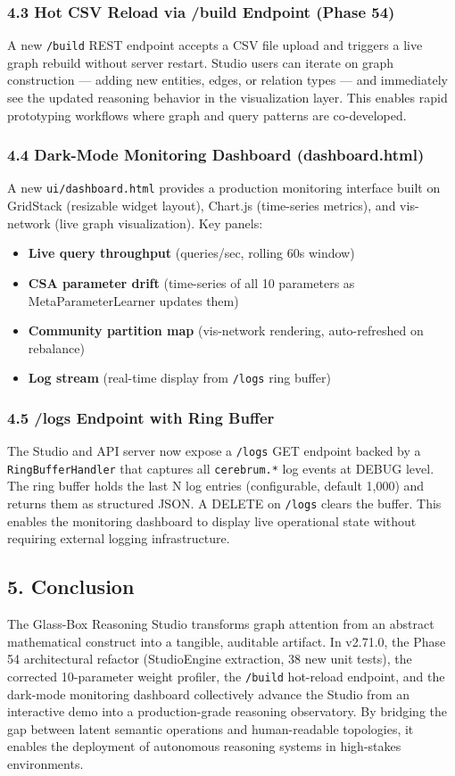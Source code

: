 \subsubsection*{4.3 Hot CSV Reload via /build Endpoint (Phase 54)}
A new \texttt{/build} REST endpoint accepts a CSV file upload and triggers a live graph rebuild without server restart. Studio users can iterate on graph construction --- adding new entities, edges, or relation types --- and immediately see the updated reasoning behavior in the visualization layer. This enables rapid prototyping workflows where graph and query patterns are co-developed.

\subsubsection*{4.4 Dark-Mode Monitoring Dashboard (dashboard.html)}
A new \texttt{ui/dashboard.html} provides a production monitoring interface built on GridStack (resizable widget layout), Chart.js (time-series metrics), and vis-network (live graph visualization). Key panels:
\begin{itemize}
  \item \textbf{Live query throughput} (queries/sec, rolling 60s window)
  \item \textbf{CSA parameter drift} (time-series of all 10 parameters as MetaParameterLearner updates them)
  \item \textbf{Community partition map} (vis-network rendering, auto-refreshed on rebalance)
  \item \textbf{Log stream} (real-time display from \texttt{/logs} ring buffer)
\end{itemize}


\subsubsection*{4.5 /logs Endpoint with Ring Buffer}
The Studio and API server now expose a \texttt{/logs} GET endpoint backed by a \texttt{RingBufferHandler} that captures all \texttt{cerebrum.*} log events at DEBUG level. The ring buffer holds the last N log entries (configurable, default 1,000) and returns them as structured JSON. A DELETE on \texttt{/logs} clears the buffer. This enables the monitoring dashboard to display live operational state without requiring external logging infrastructure.

\subsection*{5. Conclusion}
The Glass-Box Reasoning Studio transforms graph attention from an abstract mathematical construct into a tangible, auditable artifact. In v2.71.0, the Phase 54 architectural refactor (StudioEngine extraction, 38 new unit tests), the corrected 10-parameter weight profiler, the \texttt{/build} hot-reload endpoint, and the dark-mode monitoring dashboard collectively advance the Studio from an interactive demo into a production-grade reasoning observatory. By bridging the gap between latent semantic operations and human-readable topologies, it enables the deployment of autonomous reasoning systems in high-stakes environments.